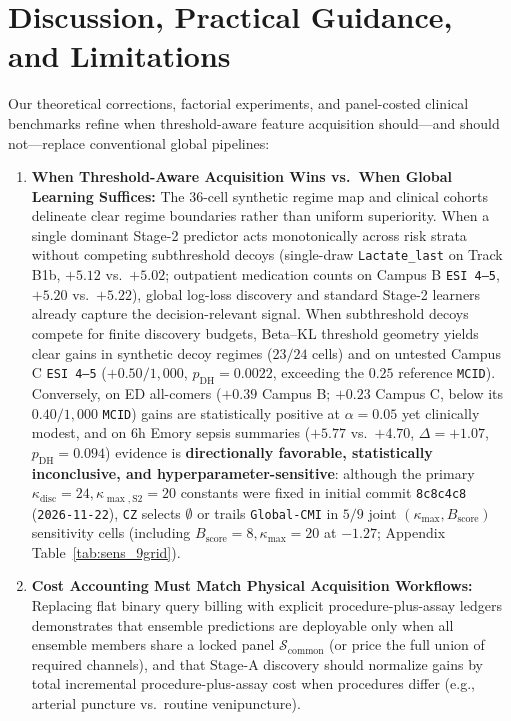 \documentclass[11pt]{article}
\begin{document}
\section{Discussion, Practical Guidance, and Limitations}
\label{sec:discussion}

Our theoretical corrections, factorial experiments, and panel-costed clinical benchmarks refine when threshold-aware feature acquisition should---and should not---replace conventional global pipelines:
\begin{enumerate}
  \item \textbf{When Threshold-Aware Acquisition Wins vs.\ When Global Learning Suffices:} The $36$-cell synthetic regime map and clinical cohorts delineate clear regime boundaries rather than uniform superiority. When a single dominant Stage-2 predictor acts monotonically across risk strata without competing subthreshold decoys (single-draw \texttt{Lactate\_last} on Track B1b, $+5.12$ vs.\ $+5.02$; outpatient medication counts on Campus B \texttt{ESI 4--5}, $+5.20$ vs.\ $+5.22$), global log-loss discovery and standard Stage-2 learners already capture the decision-relevant signal. When subthreshold decoys compete for finite discovery budgets, Beta--KL threshold geometry yields clear gains in synthetic decoy regimes ($23/24$ cells) and on untested Campus C \texttt{ESI 4--5} ($+0.50/1{,}000$, $p_{\text{DH}}=0.0022$, exceeding the $0.25$ reference \texttt{MCID}). Conversely, on ED all-comers ($+0.39$ Campus B; $+0.23$ Campus C, below its $0.40/1{,}000$ \texttt{MCID}) gains are statistically positive at $\alpha=0.05$ yet clinically modest, and on $6\text{h}$ Emory sepsis summaries ($+5.77$ vs.\ $+4.70$, $\Delta=+1.07$, $p_{\text{DH}}=0.094$) evidence is \textbf{directionally favorable, statistically inconclusive, and hyperparameter-sensitive}: although the primary $\kappa_{\text{disc}}=24, \kappa_{\max,\text{S2}}=20$ constants were fixed in initial commit \texttt{8c8c4c8} (\texttt{2026-11-22}), \texttt{CZ} selects $\emptyset$ or trails \texttt{Global-CMI} in $5/9$ joint $(\kappa_{\max}, B_{\text{score}})$ sensitivity cells (including $B_{\text{score}}=8, \kappa_{\max}=20$ at $-1.27$; Appendix Table~\ref{tab:sens_9grid}).
  \item \textbf{Cost Accounting Must Match Physical Acquisition Workflows:} Replacing flat binary query billing with explicit procedure-plus-assay ledgers demonstrates that ensemble predictions are deployable only when all ensemble members share a locked panel $\mathcal{S}_{\text{common}}$ (or price the full union of required channels), and that Stage-A discovery should normalize gains by total incremental procedure-plus-assay cost when procedures differ (e.g., arterial puncture vs.\ routine venipuncture).

\end{enumerate}
\end{document}
